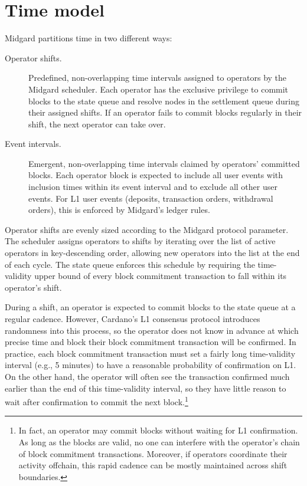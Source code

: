 \documentclass[../midgard.tex]{subfiles}
\begin{document}
\section{Time model}
\label{h:time-model}

Midgard partitions time in two different ways:
\begin{description}
    \item[Operator shifts.] Predefined, non-overlapping time intervals assigned to operators by the Midgard scheduler. Each operator has the exclusive privilege to commit blocks to the state queue and resolve nodes in the settlement queue during their assigned shifts. If an operator fails to commit blocks regularly in their shift, the next operator can take over.
    \item[Event intervals.] Emergent, non-overlapping time intervals claimed by operators' committed blocks. Each operator block is expected to include all user events with inclusion times within its event interval and to exclude all other user events. For L1 user events (deposits, transaction orders, withdrawal orders), this is enforced by Midgard's ledger rules.
\end{description}

Operator shifts are evenly sized according to the  Midgard protocol parameter. The scheduler assigns operators to shifts by iterating over the list of active operators in key-descending order, allowing new operators into the list at the end of each cycle. The state queue enforces this schedule by requiring the time-validity upper bound of every block commitment transaction to fall within its operator's shift.

During a shift, an operator is expected to commit blocks to the state queue at a regular cadence. However, Cardano's L1 consensus protocol introduces randomness into this process, so the operator does not know in advance at which precise time and block their block commitment transaction will be confirmed. In practice, each block commitment transaction must set a fairly long time-validity interval (e.g., 5 minutes) to have a reasonable probability of confirmation on L1. On the other hand, the operator will often see the transaction confirmed much earlier than the end of this time-validity interval, so they have little reason to wait after confirmation to commit the next block.\footnote{In fact, an operator may commit blocks without waiting for L1 confirmation. As long as the blocks are valid, no one can interfere with the operator's chain of block commitment transactions. Moreover, if operators coordinate their activity offchain, this rapid cadence can be mostly maintained across shift boundaries.}
\end{document}
